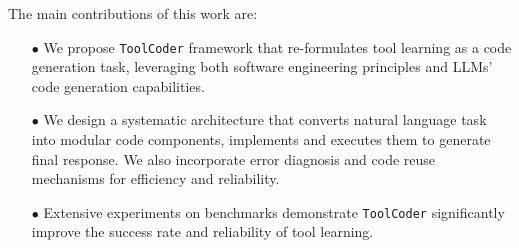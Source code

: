The main contributions of this work are:
\begin{itemize}[leftmargin=0.6cm, itemindent=0cm, itemsep=0pt]
    \item[$\bullet$] We propose \texttt{ToolCoder} framework that re-formulates tool learning as a code generation task, leveraging both software engineering principles and LLMs' code generation capabilities.
    \item[$\bullet$] We design a systematic architecture that converts natural language task into modular code components, implements and executes them to generate final response. We also incorporate error diagnosis and code reuse mechanisms for efficiency and reliability.
    \item[$\bullet$] Extensive experiments on benchmarks demonstrate \texttt{ToolCoder} significantly improve the success rate and reliability of tool learning.
\end{itemize}